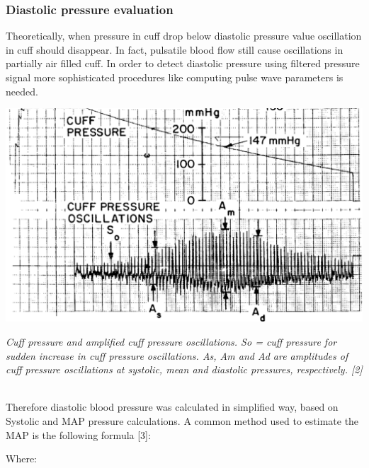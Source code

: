 \subsubsection*{Diastolic pressure evaluation}

Theoretically, when pressure in cuff drop below diastolic pressure value oscillation in cuff should disappear. In fact, pulsatile blood flow still cause oscillations in partially air filled cuff. In order to detect diastolic pressure using filtered pressure signal more sophisticated procedures like computing pulse wave parameters is needed.


\begin{DoxyImage}
\includegraphics[width=\textwidth,height=\textheight/2,keepaspectratio=true]{cuffOscillations.png}
\end{DoxyImage}
 {\itshape  Cuff pressure and amplified cuff pressure oscillations. So = cuff pressure for sudden increase in cuff pressure oscillations. As, Am and Ad are amplitudes of cuff pressure oscillations at systolic, mean and diastolic pressures, respectively. \mbox{[}2\mbox{]} }~\newline


Therefore diastolic blood pressure was calculated in simplified way, based on Systolic and M\+AP pressure calculations. A common method used to estimate the M\+AP is the following formula \mbox{[}3\mbox{]}\+: 
\begin{DoxyCode}{0}
\end{DoxyCode}
 Where\+: 
\begin{DoxyCode}{0}
\end{DoxyCode}


